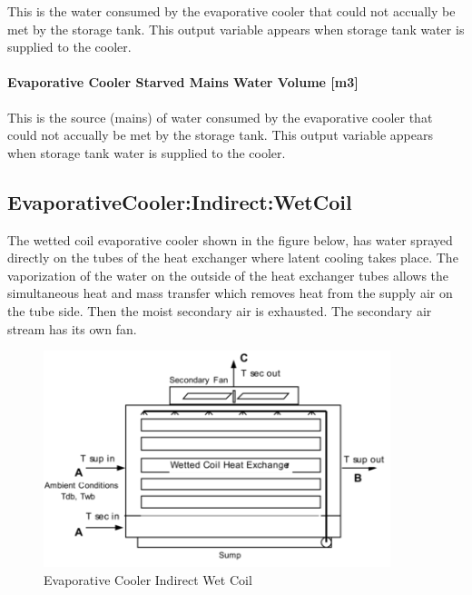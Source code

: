 This is the water consumed by the evaporative cooler that could not accually be met by the storage tank. This output variable appears when storage tank water is supplied to the cooler.

\paragraph{Evaporative Cooler Starved Mains Water Volume {[}m3{]}}\label{evaporative-cooler-starved-mains-water-volume-m3-2}

This is the source (mains) of water consumed by the evaporative cooler that could not accually be met by the storage tank. This output variable appears when storage tank water is supplied to the cooler.

\subsection{EvaporativeCooler:Indirect:WetCoil}\label{evaporativecoolerindirectwetcoil}

The wetted coil evaporative cooler shown in the figure below, has water sprayed directly on the tubes of the heat exchanger where latent cooling takes place. The vaporization of the water on the outside of the heat exchanger tubes allows the simultaneous heat and mass transfer which removes heat from the supply air on the tube side. Then the moist secondary air is exhausted. The secondary air stream has its own fan.

\begin{figure}[hbtp] %
\centering
\includegraphics[width=0.9\textwidth, height=0.9\textheight, keepaspectratio=true]{media/image421.png}
\caption{Evaporative Cooler Indirect Wet Coil \protect \label{fig:evaporative-cooler-indirect-wet-coil}}
\end{figure}

